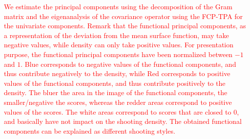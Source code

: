 \textcolor{red}{We estimate the principal components using the decomposition of the Gram matrix and the eigenanalysis of the covariance operator using the FCP-TPA for the univariate components.
Remark that the functional principal components, as a representation of the deviation from the mean surface function, may take negative values, while density can only take positive values. For presentation purpose, the functional principal components have been normalized between $-1$ and $1$. Blue corresponds to negative values of the functional components, and thus contribute negatively to the density, while Red corresponds to positive values of the functional components, and thus contribute positively to the density. The bluer the area in the image of the functional components, the smaller/negative the scores, whereas the redder areas correspond to positive values of the scores. The white areas correspond to scores that are closed to $0$, and basically have not impact on the shooting density. The obtained functional components can be explained as different shooting styles.}
